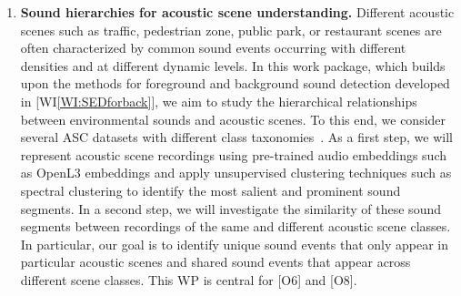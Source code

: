 \documentclass[11pt,a4paper]{article}
\theoremstyle{plain} \newtheorem{define}{Definition}[section]
\begin{document}
{\begin{enumerate}[itemindent=0.5cm]
\item  \label{WI:SEDhierarchies}
\textbf{Sound hierarchies for acoustic scene understanding.}
%
Different acoustic scenes such as traffic, pedestrian zone, public park, or restaurant scenes are often characterized by common sound events occurring with different densities and at different dynamic levels.
%
In this work package, which builds upon the methods for foreground and background sound detection developed in [WI\ref{WI:SEDforback}], we aim to study the hierarchical relationships between environmental sounds and acoustic scenes. To this end, we consider several ASC datasets with different class taxonomies~\cite{Abesser20_AcousticSceneClassification_AppliedSciences}. As a first step, we will represent acoustic scene recordings using pre-trained audio embeddings such as OpenL3 embeddings \cite{Cramer:2019:OpenL3:ICASSP} and apply unsupervised clustering techniques such as spectral clustering to identify the most salient and prominent sound segments. 
%
In a second step, we will investigate the similarity of these sound segments between recordings of the same and different acoustic scene classes. In particular, our goal is to identify unique sound events that only appear in particular acoustic scenes and shared sound events that appear across different scene classes.
%
This WP is central for [O6] and [O8].


\end{enumerate}}
\end{document}
